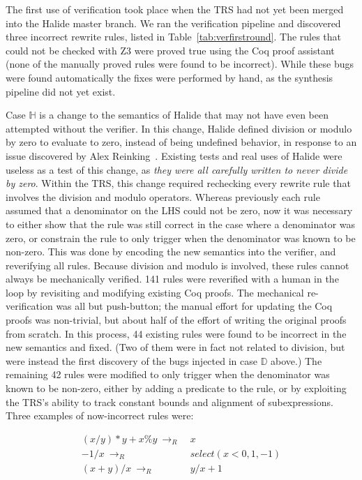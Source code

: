 \documentclass[acmsmall,review]{acmart}\settopmatter{printfolios=true,printccs=false,printacmref=false}
\newcommand{\rewrites}[0]{\:\rightarrow_{R}\:}
\begin{document}
The first use of verification took place when the TRS had not yet been merged into the Halide master branch. We ran the verification pipeline and discovered three incorrect rewrite rules, listed in Table~\ref{tab:verfirstround}. The rules that could not be checked with Z3 were proved true using the Coq proof assistant (none of the manually proved rules were found to be incorrect). While these bugs were found automatically the fixes were performed by hand, as the synthesis pipeline did not yet exist. 

Case $\mathbb{H}$ is a change to the semantics of Halide that may not have even been attempted without the verifier. In this change, Halide defined division or modulo by zero to evaluate to zero, instead of being undefined behavior, in response to an issue discovered by Alex Reinking~\cite{reinkingthesis}. Existing tests and real uses of Halide were useless as a test of this change, as \emph{they were all carefully written to never divide by zero}. Within the TRS, this change required rechecking every rewrite rule that involves the division and modulo operators. Whereas previously each rule assumed that a denominator on the LHS could not be zero, now it was necessary to either show that the rule was still correct in the case where a denominator was zero, or constrain the rule to only trigger when the denominator was known to be non-zero. This was done by encoding the new semantics into the verifier, and reverifying all rules. Because division and modulo is involved, these rules cannot always be mechanically verified. 141 rules were reverified with a human in the loop by revisiting and modifying existing Coq proofs. The mechanical re-verification was all but push-button; the manual effort for updating the Coq proofs was non-trivial, but about half of the effort of writing the original proofs from scratch. In this process, 44 existing rules were found to be incorrect in the new semantics and fixed. (Two of them were in fact not related to division, but were instead the first discovery of the bugs injected in case $\mathbb{D}$ above.) The remaining 42 rules were modified to only trigger when the denominator was known to be non-zero, either by adding a predicate to the rule, or by exploiting the TRS’s ability to track constant bounds and alignment of subexpressions. Three examples of now-incorrect rules were:

\begin{align*}
(x/y)*y + x\%y \rewrites & x \\
  -1 / x \rewrites & select(x < 0, 1, -1) \\
(x + y)/x \rewrites & y/x + 1
\end{align*}
\end{document}
